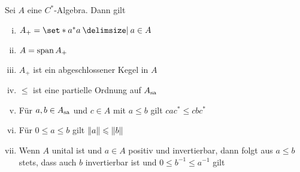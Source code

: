 \begin{satz}[label=satz:37,{name=[Eigenschaften positiver Elemente]}]
	Sei $A$ eine $C^*$-Algebra. Dann gilt
	\begin{enumerate}[(i),itemsep=2pt]
		\item $A_+ = \set*{a^*a \given a \in A}$
		\item $A = \Span A_+$
		\item $A_+$ ist ein abgeschlossener Kegel in $A$
		\item $\le$ ist eine partielle Ordnung auf $A_\sa$
		\item Für $a,b \in A_\sa$ und $c \in A$ mit $a \le b$ gilt $c a c^* \le c b c^*$
		\item Für $0 \le a \le b$ gilt $\norm*{a} \le \norm*{b}$
		\item Wenn $A$ unital ist und $a \in A$ positiv und invertierbar, dann folgt aus $a \le b$ stets, dass auch $b$ invertierbar ist und $0 \le b^{-1} \le a^{-1}$ gilt
	\end{enumerate}
\end{satz}
